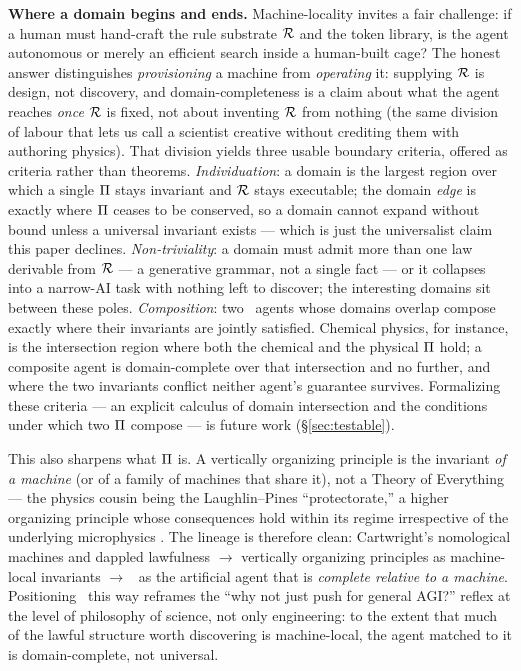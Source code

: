 \textbf{Where a domain begins and ends.} Machine-locality invites a fair challenge: if a human must hand-craft the rule substrate $\mathcal{R}$ and the token library, is the agent autonomous or merely an efficient search inside a human-built cage? The honest answer distinguishes \emph{provisioning} a machine from \emph{operating} it: supplying $\mathcal{R}$ is design, not discovery, and domain-completeness is a claim about what the agent reaches \emph{once} $\mathcal{R}$ is fixed, not about inventing $\mathcal{R}$ from nothing (the same division of labour that lets us call a scientist creative without crediting them with authoring physics). That division yields three usable boundary criteria, offered as criteria rather than theorems. \emph{Individuation}: a domain is the largest region over which a single $\Pi$ stays invariant and $\mathcal{R}$ stays executable; the domain \emph{edge} is exactly where $\Pi$ ceases to be conserved, so a domain cannot expand without bound unless a universal invariant exists --- which is just the universalist claim this paper declines. \emph{Non-triviality}: a domain must admit more than one law derivable from $\mathcal{R}$ --- a generative grammar, not a single fact --- or it collapses into a narrow-AI task with nothing left to discover; the interesting domains sit between these poles. \emph{Composition}: two \DCI\ agents whose domains overlap compose exactly where their invariants are jointly satisfied. Chemical physics, for instance, is the intersection region where both the chemical and the physical $\Pi$ hold; a composite agent is domain-complete over that intersection and no further, and where the two invariants conflict neither agent's guarantee survives. Formalizing these criteria --- an explicit calculus of domain intersection and the conditions under which two $\Pi$ compose --- is future work (\S\ref{sec:testable}).

This also sharpens what $\Pi$ is. A vertically organizing principle is the invariant \emph{of a machine} (or of a family of machines that share it), not a Theory of Everything --- the physics cousin being the Laughlin--Pines ``protectorate,'' a higher organizing principle whose consequences hold within its regime irrespective of the underlying microphysics \citep{laughlin2000}. The lineage is therefore clean: Cartwright's nomological machines and dappled lawfulness $\rightarrow$ vertically organizing principles as machine-local invariants \citep{frasch2026a} $\rightarrow$ \DCI\ as the artificial agent that is \emph{complete relative to a machine}. Positioning \DCI\ this way reframes the ``why not just push for general AGI?'' reflex at the level of philosophy of science, not only engineering: to the extent that much of the lawful structure worth discovering is machine-local, the agent matched to it is domain-complete, not universal.
